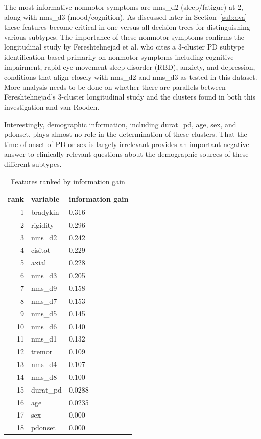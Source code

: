 \documentclass[10pt]{article}
\begin{document}
\begin{multicols}{2}
The most informative nonmotor
symptoms are nms\_d2 (sleep/fatigue) at 2, along with nms\_d3
(mood/cognition). As discussed later in Section~\ref{sub:ova} these features
become critical in one-versus-all decision trees for distinguishing various
subtypes. The importance of these nonmotor symptoms confirms the longitudinal
study by Fereshtehnejad et al. \cite{fereshtehnejad15} who cites a 3-cluster PD
subtype identification based primarily on nonmotor symptoms including cognitive
impairment, rapid eye movement sleep disorder (RBD), anxiety, and depression,
conditions that align closely with nms\_d2 and nms\_d3 as tested in this
dataset. More analysis needs to be done on whether there are parallels between
Fereshtehnejad's 3-cluster longitudinal study and the clusters found in both
this investigation and van Rooden.

Interestingly, demographic information, including durat\_pd, age, sex, and
pdonset, plays almost no role in the determination of these clusters. That the
time of onset of PD or sex is largely irrelevant provides an important negative answer to
clinically-relevant questions about the demographic sources of these different
subtypes.

\begin{table}[H]
  \centering
  \begin{tabular}{r|l|l}
    rank & variable & information gain \\
    \hline
    1 & bradykin      & 0.316 \\
    2 & rigidity      & 0.296 \\
    3 & nms\_d2      & 0.242 \\
    4 & cisitot      & 0.229 \\
    5 & axial      & 0.228 \\
    6 & nms\_d3      & 0.205 \\
    7 & nms\_d9      & 0.158 \\
    8 & nms\_d7      & 0.153 \\
    9 & nms\_d5      & 0.145 \\
    10 & nms\_d6      & 0.140 \\
    11 & nms\_d1      & 0.132 \\
    12 & tremor      & 0.109 \\
    13 & nms\_d4      & 0.107 \\
    14 & nms\_d8      & 0.100 \\
    15 & durat\_pd      & 0.0288 \\
    16 & age      & 0.0235 \\
    17 & sex      & 0.000 \\
    18 & pdonset      & 0.000 \\
  \end{tabular}
  \caption{Features ranked by information gain}
  \label{tab:info_gain}
\end{table}


\end{multicols}
\end{document}
